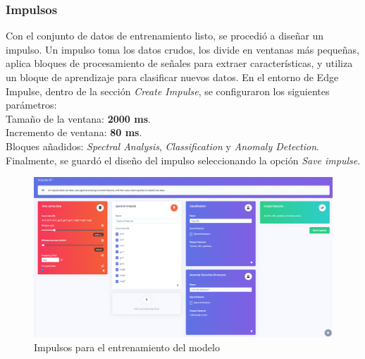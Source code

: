 \documentclass[12pt,a4paper]{article}
\begin{document}
\subsubsection{Impulsos}

Con el conjunto de datos de entrenamiento listo, se procedió a diseñar un impulso. Un impulso toma los datos crudos, los divide en ventanas más pequeñas, aplica bloques de procesamiento de señales para extraer características, y utiliza un bloque de aprendizaje para clasificar nuevos datos. En el entorno de Edge Impulse, dentro de la sección \textit{Create Impulse}, se configuraron los siguientes parámetros:\\
Tamaño de la ventana: \textbf{2000 ms}.\\
Incremento de ventana: \textbf{80 ms}.\\
Bloques añadidos: \textit{Spectral Analysis}, \textit{Classification} y \textit{Anomaly Detection}.\\
Finalmente, se guardó el diseño del impulso seleccionando la opción \textit{Save impulse}.

\begin{figure}[H]
    \centering
    \includegraphics[width=0.7\linewidth]{Imagenes/impulse.png}
    \caption{Impulsos para el entrenamiento del modelo}
    \label{fig:8}
\end{figure}
\end{document}
